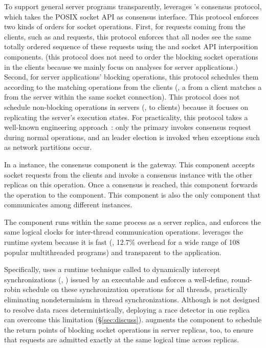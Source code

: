 To support general server programs transparently, \xxx leverages \repbox's 
\paxos consensus protocol, which takes the POSIX socket API as
consensus interface. This \paxos protocol enforces two kinds of 
orders for socket operations. First, for requests coming from the clients, 
such as \connect and \send requests, this protocol enforces that all nodes see 
the same totally ordered sequence of these requests using the \paxos and socket 
API interposition components.  (this protocol does not need to order the 
blocking socket operations in the clients because we mainly focus on analyses 
for server applications.) Second, for server applications' blocking operations, 
this \paxos protocol schedules them according to the matching operations from 
the clients (\eg, a \send from a client matches a \recv from the server within 
the same socket connection). This protocol does not schedule non-blocking 
operations in servers (\eg, \send to clients) because it focuses on replicating 
the server's execution states. For practicality, this \paxos protocol takes a 
well-known engineering approach~\cite{paxos:practical}: only the 
primary invokes consensus request during normal operations, and an leader 
election is invoked when exceptions such as network partitions occur.


In a \xxx instance, the \paxos consensus component is the gateway.  This 
component accepts socket requests from the clients and invoke a \paxos 
consensus instance with the other replicas on this operation. Once a consensus 
is reached, this component forwards the operation to the \dmt component. This 
component is also the only \xxx component that communicates among different 
\xxx instances. 


The \dmt component runs within the same process as a server replica, and
enforces the same logical clocks for inter-thread communication
operations. \xxx leverages the \parrot~\cite{parrot:sosp13} \dmt runtime
system because it is fast (\ie, 12.7\% overhead for a wide range of 108 popular 
multithreaded programs) and transparent to the application.


Specifically, \parrot uses a runtime technique called \ldpreload to dynamically 
intercept \pthread synchronizations (\eg, \mutexlock) issued by an executable 
and enforces a well-define, round-robin schedule on these synchronization 
operations for all threads, practically eliminating nondeterminism in thread
synchronizations. Although \parrot is not designed to resolve data races
deterministically, deploying a race detector in one replica can overcome this 
limitation (\S\ref{sec:discuss}).  \xxx augments the \dmt component to schedule 
the return points of blocking socket operations in server replicas, too, to 
ensure that requests are admitted exactly at the same logical time across 
replicas.


